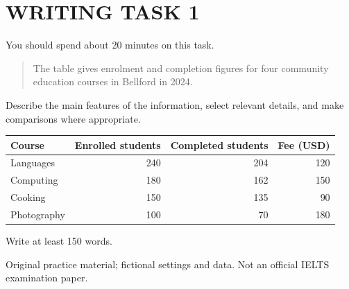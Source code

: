 \section*{WRITING TASK 1}
You should spend about 20 minutes on this task.

\begin{quote}\large The table gives enrolment and completion figures for four community education courses in Bellford in 2024.
\end{quote}
Describe the main features of the information, select relevant details, and make comparisons where appropriate.

\begin{center}
\renewcommand{\arraystretch}{1.6}
\begin{tabular}{|l|r|r|r|}\hline
Course & Enrolled students & Completed students & Fee (USD)\\\hline
Languages & 240 & 204 & 120\\
Computing & 180 & 162 & 150\\
Cooking & 150 & 135 & 90\\
Photography & 100 & 70 & 180\\\hline
\end{tabular}
\end{center}
Write at least 150 words.
\par\bigskip
{\footnotesize\color{gray} Original practice material; fictional settings and data. Not an official IELTS examination paper.}
